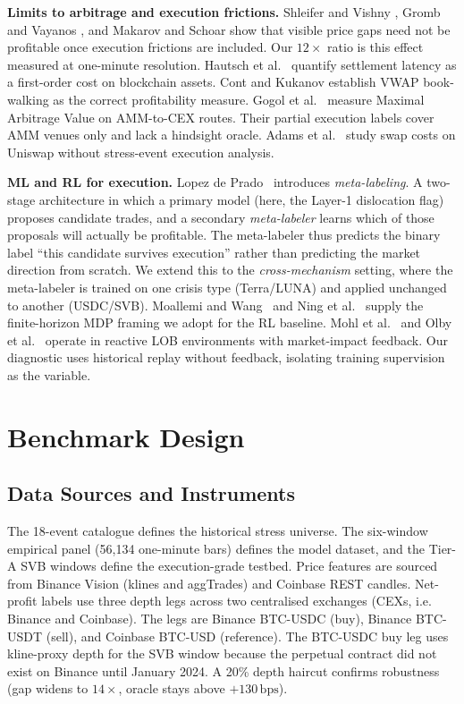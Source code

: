 \documentclass[sigconf,anonymous,natbib=false]{acmart}
\newcommand{\bps}{\,\text{bps}}
\begin{document}
\textbf{Limits to arbitrage and execution frictions.}
Shleifer and Vishny \cite{shleifer1997limits}, Gromb and Vayanos
\cite{gromb2010limits}, and Makarov and Schoar
\cite{makarov2020trading} show that visible price gaps need not be
profitable once execution frictions are included.
Our $12\times$ ratio is this effect measured at one-minute resolution.
Hautsch et al.\ \cite{hautsch2018blockchain} quantify settlement latency
as a first-order cost on blockchain assets.
Cont and Kukanov \cite{cont2013optimal} establish VWAP book-walking
as the correct profitability measure.
Gogol et al.\ \cite{gogol2024amm} measure Maximal Arbitrage Value on
AMM-to-CEX routes. Their partial execution labels cover AMM venues
only and lack a hindsight oracle.
Adams et al.\ \cite{adams2023mev} study swap costs on Uniswap without
stress-event execution analysis.

\textbf{ML and RL for execution.}
Lopez de Prado~\cite{lopezdeprado2018} introduces \emph{meta-labeling}. A
two-stage architecture in which a primary model (here, the Layer-1 dislocation
flag) proposes candidate trades, and a secondary \emph{meta-labeler} learns
which of those proposals will actually be profitable.  The meta-labeler thus
predicts the binary label ``this candidate survives execution'' rather than
predicting the market direction from scratch.  We extend this to the
\emph{cross-mechanism} setting, where the meta-labeler is trained on one crisis
type (Terra/LUNA) and applied unchanged to another (USDC/SVB).
Moallemi and Wang~\cite{moallemi2022rl} and Ning et al.~\cite{ning2021ddql}
supply the finite-horizon MDP framing we adopt for the RL baseline.
Mohl et al.\ \cite{jaxmarlhft2024} and Olby et al.\
\cite{rightplace2024} operate in reactive LOB environments with
market-impact feedback. Our diagnostic uses historical replay
without feedback, isolating training supervision as the variable.


\section{Benchmark Design}
\label{sec:benchmark}

\subsection{Data Sources and Instruments}
\label{sec:data}

The 18-event catalogue defines the historical stress universe. The
six-window empirical panel (56,134 one-minute bars) defines the model
dataset, and the Tier-A SVB windows define the execution-grade testbed.
Price features are sourced from Binance Vision (klines and aggTrades)
and Coinbase REST candles.
Net-profit labels use three depth legs across two centralised
exchanges (CEXs, i.e. Binance and Coinbase). The legs are Binance BTC-USDC (buy),
Binance BTC-USDT (sell), and Coinbase BTC-USD (reference).
The BTC-USDC buy leg uses kline-proxy depth for the SVB window because
the perpetual contract did not exist on Binance until January 2024.
A 20\% depth haircut confirms robustness (gap widens to $14\times$,
oracle stays above $+130\bps$).
\end{document}
